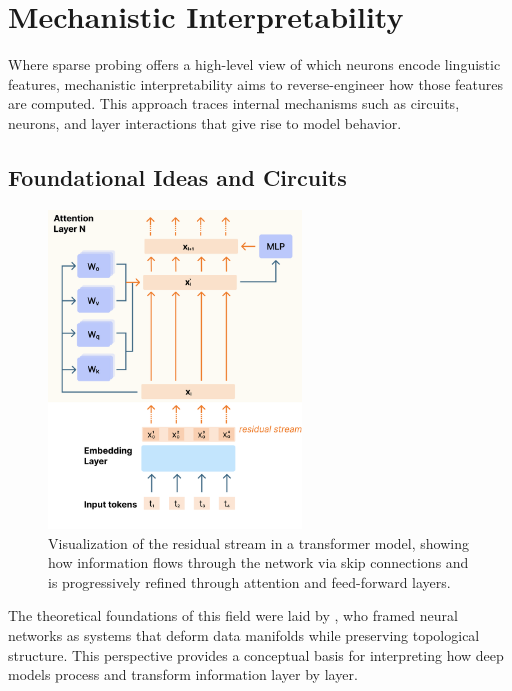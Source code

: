 \section{Mechanistic Interpretability}

Where sparse probing offers a high-level view of which neurons encode linguistic features, mechanistic interpretability aims to reverse-engineer how those features are computed. This approach traces internal mechanisms such as circuits, neurons, and layer interactions that give rise to model behavior. 

\subsection{Foundational Ideas and Circuits}

\begin{figure}[ht!]
    \centering
    \includegraphics[width=0.6\textwidth]{chapters/analysis_background/figures/residual_stream_visualization.pdf}
    \caption{Visualization of the residual stream in a transformer model, showing how information flows through the network via skip connections and is progressively refined through attention and feed-forward layers.}
    \label{fig:residual-stream}
\end{figure}


The theoretical foundations of this field were laid by \citet{olah2014manifolds}, who framed neural networks as systems that deform data manifolds while preserving topological structure. This perspective provides a conceptual basis for interpreting how deep models process and transform information layer by layer.


